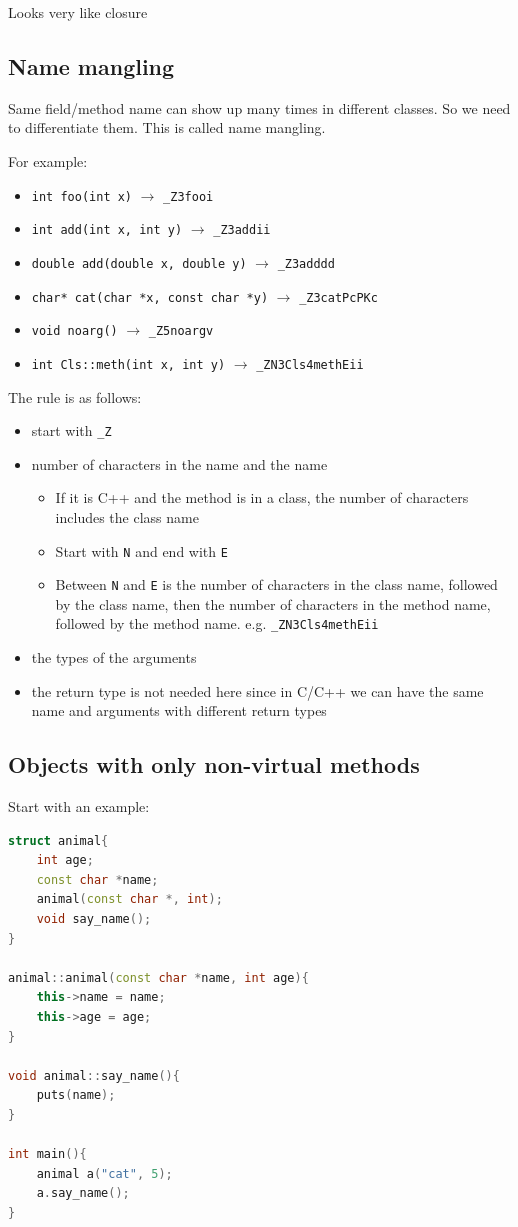 \documentclass[letterpaper,12pt]{article}
\begin{document}
Looks very like closure
\subsection{Name mangling}
Same field/method name can show up many times in different classes. So we need to differentiate them. This is called name mangling.

For example: \begin{itemize}
    \item \texttt{int foo(int x)} $\to$ \texttt{\_Z3fooi}
    \item \texttt{int add(int x, int y)} $\to$ \texttt{\_Z3addii}
    \item \texttt{double add(double x, double y)} $\to$ \texttt{\_Z3adddd}
    \item \texttt{char* cat(char *x, const char *y)} $\to$ \texttt{\_Z3catPcPKc}
    \item \texttt{void noarg()} $\to$ \texttt{\_Z5noargv}
    \item \texttt{int Cls::meth(int x, int y)} $\to$ \texttt{\_ZN3Cls4methEii}
\end{itemize}
The rule is as follows:\begin{itemize}
    \item start with \texttt{\_Z}
    \item number of characters in the name and the name\begin{itemize}
        \item If it is C++ and the method is in a class, the number of characters includes the class name
        \item Start with \texttt{N} and end with \texttt{E}
        \item Between \texttt{N} and \texttt{E} is the number of characters in the class name, followed by the class name, then the number of characters in the method name, followed by the method name. e.g. \texttt{\_ZN3Cls4methEii}
    \end{itemize}
    \item the types of the arguments
    \item the return type is not needed here since in C/C++ we can have the same name and arguments with different return types
\end{itemize}
\subsection{Objects with only non-virtual methods}
Start with an example: \begin{lstlisting}[language=C++]
struct animal{
    int age;
    const char *name;
    animal(const char *, int);
    void say_name();
}

animal::animal(const char *name, int age){
    this->name = name;
    this->age = age;
}

void animal::say_name(){
    puts(name);
}

int main(){
    animal a("cat", 5);
    a.say_name();
}
\end{lstlisting}
\end{document}
